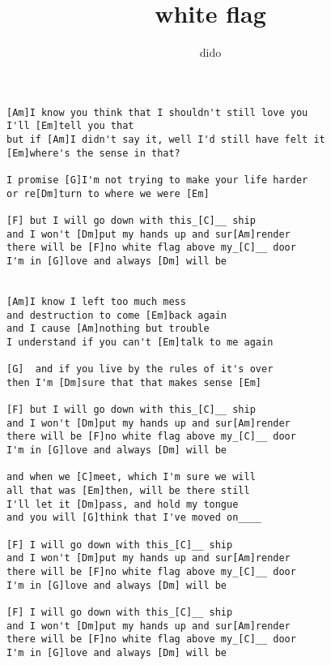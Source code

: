 \author{dido}
\title{white flag}
\maketitle
\begin{verbatim}
[Am]I know you think that I shouldn't still love you
I'll [Em]tell you that 
but if [Am]I didn't say it, well I'd still have felt it 
[Em]where's the sense in that? 

I promise [G]I'm not trying to make your life harder 
or re[Dm]turn to where we were [Em]

[F] but I will go down with this_[C]__ ship
and I won't [Dm]put my hands up and sur[Am]render 
there will be [F]no white flag above my_[C]__ door 
I'm in [G]love and always [Dm] will be 


[Am]I know I left too much mess 
and destruction to come [Em]back again 
and I cause [Am]nothing but trouble 
I understand if you can't [Em]talk to me again 

[G]  and if you live by the rules of it's over 
then I'm [Dm]sure that that makes sense [Em]

[F] but I will go down with this_[C]__ ship
and I won't [Dm]put my hands up and sur[Am]render 
there will be [F]no white flag above my_[C]__ door 
I'm in [G]love and always [Dm] will be 

and when we [C]meet, which I'm sure we will 
all that was [Em]then, will be there still 
I'll let it [Dm]pass, and hold my tongue 
and you will [G]think that I've moved on____

[F] I will go down with this_[C]__ ship
and I won't [Dm]put my hands up and sur[Am]render 
there will be [F]no white flag above my_[C]__ door 
I'm in [G]love and always [Dm] will be 

[F] I will go down with this_[C]__ ship
and I won't [Dm]put my hands up and sur[Am]render 
there will be [F]no white flag above my_[C]__ door 
I'm in [G]love and always [Dm] will be 
\end{verbatim}